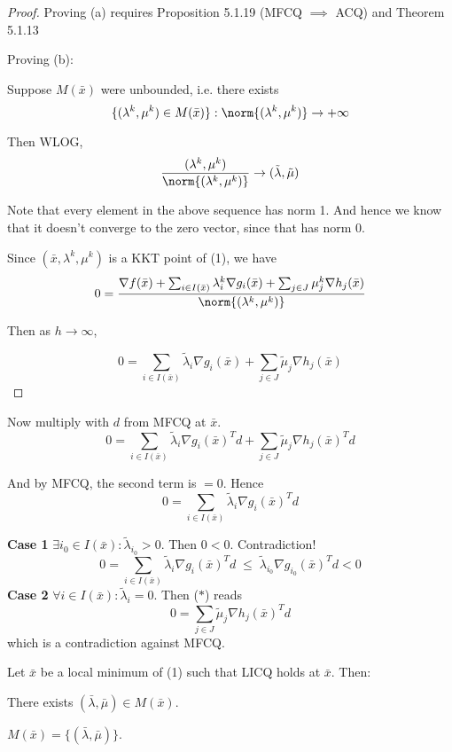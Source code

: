 \begin{proof}
	Proving (a) requires Proposition 5.1.19 (MFCQ $\implies$ ACQ) and
	Theorem 5.1.13

	Proving (b):

	Suppose $M(\bar x)$ were unbounded, i.e. there exists
	$$
		\{(\lambda^k,\mu^k)\in M(\bar x)\} : \norm{(\lambda^k,\mu^k)}\to+\infty
	$$

	Then WLOG,
	$$
		\frac{(\lambda^k,\mu^k)}{\norm{(\lambda^k,\mu^k)}}\to(\tilde\lambda,\tilde\mu)
	$$

	Note that every element in the above sequence has norm 1. And hence
	we know that it doesn't converge to the zero vector, since that has
	norm 0.

	Since $(\bar x,\lambda^k,\mu^k)$ is a KKT point of (1), we have
	$$
		0 = \frac{\nabla f(\bar x) + \sum_{i\in I(\bar x)}\lambda^k_i\nabla g_i(\bar x)
			+ \sum_{j\in J}\mu^k_j\nabla h_j(\bar x)}{\norm{(\lambda^k,\mu^k)}}
	$$

	Then as $h\to\infty$,

	\begin{equation*}
		0=\sum_{i\in I(\bar x)}\tilde\lambda_i\nabla g_i(\bar x)
		+ \sum_{j\in J}\tilde\mu_j\nabla h_j(\bar x)
	\end{equation*} %

\end{proof}

Now multiply with $d$ from MFCQ at $\bar x$.
\begin{equation*}
	0=\sum_{i\in I(\bar x)}\tilde\lambda_i\nabla g_i(\bar x)^Td
	+ \sum_{j\in J}\tilde\mu_j\nabla h_j(\bar x)^Td \tag*{($*$)}
\end{equation*}

And by MFCQ, the second term is $=0$. Hence
$$
	0=\sum_{i\in I(\bar x)}\tilde\lambda_i\nabla g_i(\bar x)^Td
$$

\textbf{Case 1} $\exists i_0 \in I(\bar x): \tilde\lambda_{i_0}>0$. Then
$0<0$. Contradiction!
$$
	0=\sum_{i\in I(\bar x)}\tilde\lambda_i\nabla g_i(\bar x)^Td
	\;\leq\;\tilde\lambda_{i_0}\nabla g_{i_0}(\bar x)^Td<0
$$
\textbf{Case 2} $\forall i\in I(\bar x):\tilde\lambda_i=0$. Then ($*$) reads
$$
	0=\sum_{j\in J}\tilde\mu_j\nabla h_j(\bar x)^Td
$$
which is a contradiction against MFCQ.

\label{c55a5f3}

Let $\bar x$ be a local minimum of (1) such that LICQ holds at $\bar
	x$. Then:
\begin{enumerata}
	\item There exists $(\bar\lambda,\bar\mu)\in M(\bar x)$.
	\item $M(\bar x) = \{(\bar\lambda,\bar\mu)\}$.
\end{enumerata}

